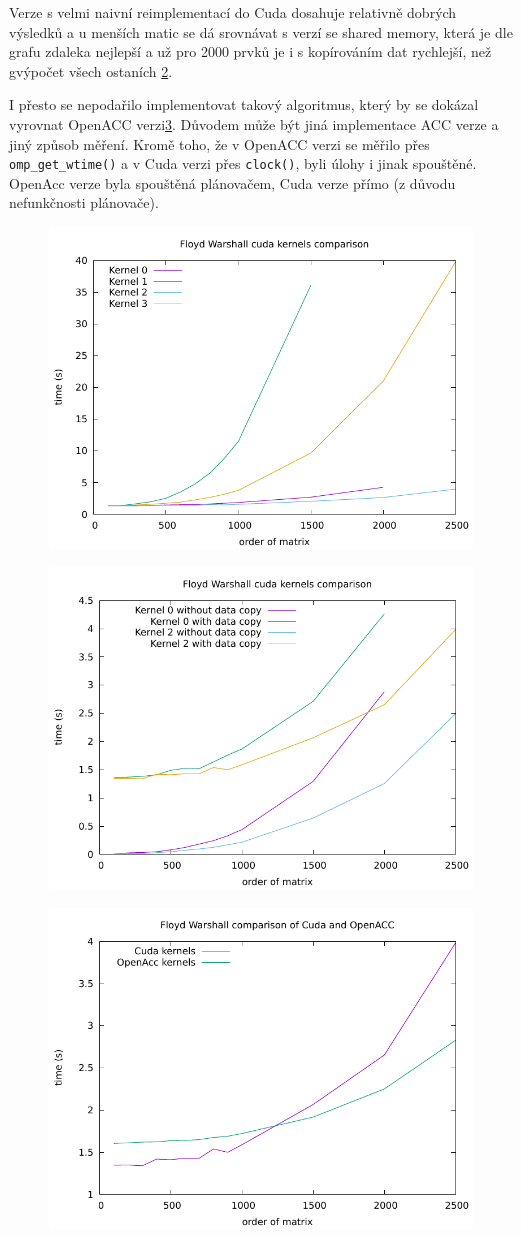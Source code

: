 \documentclass[11pt, fleqn]{article}
\begin{document}
Verze s velmi naivní reimplementací do Cuda dosahuje relativně dobrých výsledků a u menších matic se dá srovnávat s verzí se shared memory, která je dle grafu zdaleka nejlepší a už pro 2000 prvků je i s kopírováním dat rychlejší, než gvýpočet všech ostaních \ref{fig:fw4}. 

I přesto se nepodařilo implementovat takový algoritmus, který by se dokázal vyrovnat OpenACC verzi\ref{fig:fw5}. Důvodem může být jiná implementace ACC verze a jiný způsob měření. Kromě toho, že v OpenACC verzi se měřilo přes \lstinline{omp_get_wtime()} a v Cuda verzi přes \lstinline{clock()}, byli úlohy i jinak spouštěné. OpenAcc verze byla spouštěná plánovačem, Cuda verze přímo (z důvodu nefunkčnosti plánovače).

\begin{figure}
  \centering
  \includegraphics[width=.7\linewidth]{../results/FW_Cuda.pdf}
  \label{fig:fw3}
\end{figure}

\begin{figure}
  \centering
  \includegraphics[width=.7\linewidth]{../results/FW_Cuda2.pdf}
  \label{fig:fw4}
\end{figure}


\begin{figure}
  \centering
  \includegraphics[width=.7\linewidth]{../results/FW_Cuda3.pdf}
  \label{fig:fw5}
\end{figure}
\end{document}
